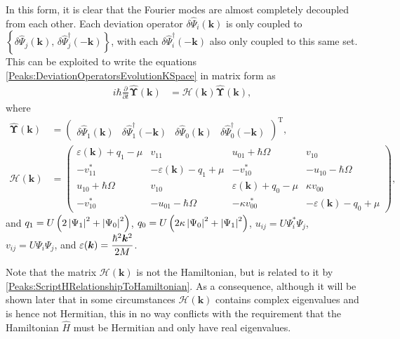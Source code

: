 In this form, it is clear that the Fourier modes are almost completely decoupled from each other. Each deviation operator $\delta\hat{\Psi}_i(\bm{k})$ is only coupled to $\left\{\delta\hat{\Psi}_j(\bm{k}),\, \delta\hat{\Psi}_j^\dagger(-\bm{k})\right\}$, with each $\delta\hat{\Psi}_i^\dagger(-\bm{k})$ also only coupled to this same set. This can be exploited to write the equations \eqref{Peaks:DeviationOperatorsEvolutionKSpace} in matrix form as
\begin{align}
    \label{Peaks:DeviationOperatorsMatrixEvolution}
    i \hbar \frac{\partial }{\partial t}\hat{\bm{\Upsilon}}(\bm{k}) &= \mathcal{H}(\bm{k}) \hat{\bm{\Upsilon}}(\bm{k}),
\end{align}
where
\begin{align}
    \hat{\bm{\Upsilon}}(\bm{k}) &= 
    \begin{pmatrix}
        \delta\hat{\Psi}_1(\bm{k}) &
        \delta\hat{\Psi}_1^\dagger(-\bm{k}) &
        \delta\hat{\Psi}_0(\bm{k}) &
        \delta\hat{\Psi}_0^\dagger(-\bm{k})
    \end{pmatrix}^\text{T},\\
    \mathcal{H}(\bm{k}) &= 
    \begin{pmatrix}
        \varepsilon(\bm{k}) + q_{1} - \mu & v_{11} & u_{01} + \hbar \Omega & v_{10}\\
        -v_{11}^* & -\varepsilon(\bm{k}) - q_1 + \mu & -v_{10}^* & -u_{10} - \hbar \Omega\\
        u_{10} + \hbar \Omega & v_{10} & \varepsilon(\bm{k}) + q_0 - \mu & \kappa v_{00}\\
        -v_{10}^* & -u_{01} - \hbar \Omega & -\kappa v_{00}^* & -\varepsilon(\bm{k}) - q_0 + \mu
    \end{pmatrix},\label{Peaks:HMatrix}
\end{align}
and $q_1 = U\left(2\left|\Psi_1\right|^2+\left|\Psi_0\right|^2\right)$, $q_0 = U\left(2\kappa \left|\Psi_0\right|^2 + \left|\Psi_1\right|^2\right)$, $u_{ij} = U\Psi_i^*\Psi_j$, $v_{ij} = U\Psi_i\Psi_j$, and $\displaystyle \protect{\varepsilon(\bm{k}) = \frac{\hbar^2 \bm{k}^2}{2M}}$.

Note that the matrix $\mathcal{H}(\bm{k})$ is not the Hamiltonian, but is related to it by \eqref{Peaks:ScriptHRelationshipToHamiltonian}. As a consequence, although it will be shown later that in some circumstances $\mathcal{H}(\bm{k})$ contains complex eigenvalues and is hence not Hermitian, this in no way conflicts with the requirement that the Hamiltonian $\hat{H}$ must be Hermitian and only have real eigenvalues.

